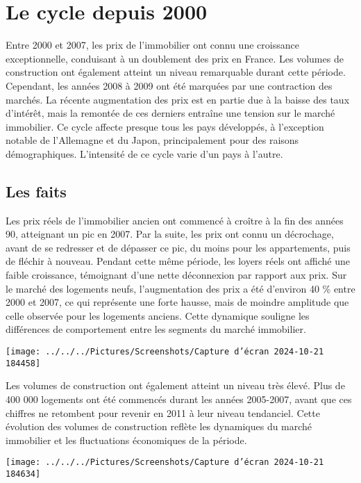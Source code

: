 \documentclass[a4paper, 12pt]{report}
\begin{document}
\section{Le cycle depuis 2000}

Entre 2000 et 2007, les prix de l'immobilier ont connu une croissance exceptionnelle, conduisant à un doublement des prix en France. Les volumes de construction ont également atteint un niveau remarquable durant cette période. Cependant, les années 2008 à 2009 ont été marquées par une contraction des marchés. La récente augmentation des prix est en partie due à la baisse des taux d'intérêt, mais la remontée de ces derniers entraîne une tension sur le marché immobilier. Ce cycle affecte presque tous les pays développés, à l'exception notable de l'Allemagne et du Japon, principalement pour des raisons démographiques. L'intensité de ce cycle varie d'un pays à l'autre.

\subsection{Les faits}

Les prix réels de l'immobilier ancien ont commencé à croître à la fin des années 90, atteignant un pic en 2007. Par la suite, les prix ont connu un décrochage, avant de se redresser et de dépasser ce pic, du moins pour les appartements, puis de fléchir à nouveau. Pendant cette même période, les loyers réels ont affiché une faible croissance, témoignant d'une nette déconnexion par rapport aux prix. Sur le marché des logements neufs, l'augmentation des prix a été d'environ 40 \% entre 2000 et 2007, ce qui représente une forte hausse, mais de moindre amplitude que celle observée pour les logements anciens. Cette dynamique souligne les différences de comportement entre les segments du marché immobilier.

\begin{center}
	\texttt{[image: ../../../Pictures/Screenshots/Capture d'écran 2024-10-21 184458]}
\end{center}

Les volumes de construction ont également atteint un niveau très élevé. Plus de 400 000 logements ont été commencés durant les années 2005-2007, avant que ces chiffres ne retombent pour revenir en 2011 à leur niveau tendanciel. Cette évolution des volumes de construction reflète les dynamiques du marché immobilier et les fluctuations économiques de la période.

\begin{center}
	\texttt{[image: ../../../Pictures/Screenshots/Capture d'écran 2024-10-21 184634]}
\end{center}
\end{document}
